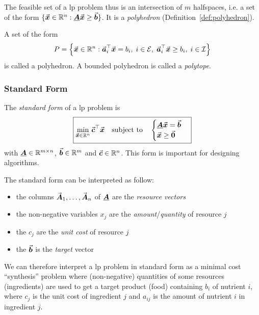 The feasible set of a \gls{lp} problem thus is an intersection of \(m\) halfspaces, i.e. a set of the form \(\{ \vec{\boldsymbol{x}} \in \mathbb{R}^{n} : \underline{\boldsymbol{A}} \vec{\boldsymbol{x}} \geq \vec{\boldsymbol{b}} \}\).
It is a \emph{polyhedron} (Definition~\ref{def:polyhedron}).

\begin{definition}[Polyhedron]\label{def:polyhedron}
  A set of the form
  \begin{equation}\label{eq:polyhedron}
    P = \left\{ \vec{\boldsymbol{x}} \in \mathbb{R}^{n} : \vec{\boldsymbol{a}}_i^\top \vec{\boldsymbol{x}} = b_i, \; i \in \mathcal{E}, \; \vec{\boldsymbol{a}}_i^\top \vec{\boldsymbol{x}} \geq b_i, \; i \in \mathcal{I} \right\}
  \end{equation}
  is called a {polyhedron}.
A bounded polyhedron is called a \emph{polytope}.
\end{definition}

\subsubsection{Standard Form}\label{sec:standardform_linear_programming}
The \emph{standard form} of a \gls{lp} problem is
\begin{equation}\label{eq:form_standard_linear_programming}
\boxed{ 
    \min_{\vec{\boldsymbol{x}} \in \mathbb{R}^{n}} \vec{\boldsymbol{c}}^\top \vec{\boldsymbol{x}} \quad \text{subject to} \quad
    \begin{cases}
      \underline{\boldsymbol{A}} \vec{\boldsymbol{x}} = \vec{\boldsymbol{b}} \\
      \vec{\boldsymbol{x}} \geq \vec{\boldsymbol{0}}
    \end{cases}
  }
\end{equation}
with \(\underline{\boldsymbol{A}} \in \mathbb{R}^{m\times n}\), \(\vec{\boldsymbol{b}} \in \mathbb{R}^{m}\) and \(\vec{\boldsymbol{c}} \in \mathbb{R}^{n}\).
This form is important for designing algorithms.

The standard form can be interpreted as follow:
\begin{itemize}
\item the columns \(\vec{\boldsymbol{A}}_1, \ldots, \vec{\boldsymbol{A}}_n\) of \(\underline{\boldsymbol{A}}\) are the \emph{resource vectors}
\item the non-negative variables \(x_j\) are the \emph{amount}/\emph{quantity} of resource \(j\)
\item the \(c_j\) are the \emph{unit cost} of resource \(j\)
\item the \(\vec{\boldsymbol{b}}\) is the \emph{target} vector
\end{itemize}
We can therefore interpret a \gls{lp} problem in standard form as a minimal cost ``synthesis'' problem where (non-negative) quantities of some resources (ingredients) are used to get a target product (food) containing \(b_i\) of nutrient \(i\), 
where \(c_j\) is the unit cost of ingredient \(j\) and \(a_{ij}\) is the amount of nutrient \(i\) in ingredient \(j\).



